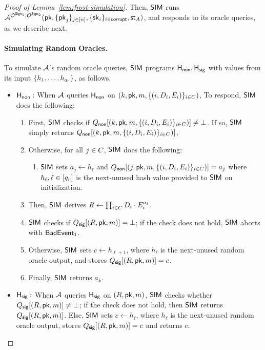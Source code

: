 \begin{proof}[Proof of Lemma~\ref{lem:frost-simulation}]
  Then,
  $\mathsf{SIM}$ runs
  $\mathcal{A}^{ \mathcal{O}^{\mathsf{Sign}_1}, \mathcal{O}^{\mathsf{Sign}_2} }(\mathsf{pk}, \{ \mathsf{pk}_j \}_{j \in [n]}, \{ \mathsf{sk}_i \}_{i \in \mathsf{corrupt}},\mathsf{st}_A)$,
  and responds to its oracle queries,
  as we describe next.

  \medskip
  \paragraph{Simulating Random Oracles.}
  To simulate $\mathcal{A}$'s random oracle queries,
  $\mathsf{SIM}$ programs $\mathsf{H_{non}}, \mathsf{H_{sig}}$ with values from its input
  $\{h_1, \ldots, h_{q_r} \}$,
  as follows.

  \begin{itemize}
  \item{}\underline{$\mathsf{H_{non}}:$} When $\mathcal{A}$ queries $\mathsf{H_{non}}$ on $(k, \mathsf{pk}, m, \{   (i, D_i, E_i)\}_{i \in C})$,
  To respond,
  $\mathsf{SIM}$ does the following:
  \begin{enumerate}
    \item First, $\mathsf{SIM}$ checks if $Q_{\mathsf{non}}[(k, \mathsf{pk}, \allowbreak m,\allowbreak \{ (i, D_i, E_i)\}_{i \in C})] \neq  \bot$.
      If so, $\mathsf{SIM}$ simply returns $Q_{\mathsf{non}}[(k, \mathsf{pk}, \allowbreak m,\allowbreak \{ (i, D_i, E_i)\}_{i \in C})] $,
    \item Otherwise, for all $j \in C$, $\mathsf{SIM}$ does the following:
  \begin{enumerate}
    \item $\mathsf{SIM}$ sets $a_j \gets h_\ell $ and
      $Q_{\mathsf{non}}[(j, \mathsf{pk}, m, \{(i, D_i, E_i)\}_{i \in C})] = a_j$
      where $h_\ell, \ell \in [q_r]$ is the next-unused hash value provided to $\mathsf{SIM}$ on initialization.
  \end{enumerate}
    \item Then, $\mathsf{SIM}$ derives
    $R \gets \prod_{i \in C} D_i \cdot E_i^{a_i}$.
    \item $\mathsf{SIM}$ checks if $Q_{\mathsf{sig}}[(R, \mathsf{pk}, m)] = \bot$;
      if the check does not hold,
      $\mathsf{SIM}$ aborts with $\mathsf{BadEvent}_1$.
    \item Otherwise, $\mathsf{SIM}$ sets $c \gets h_{\ell+1}$,
      where $h_\ell$ is the next-unused random oracle output,
      and stores $Q_{\mathsf{sig}}[(R, \mathsf{pk}, m)] = c$.
    \item Finally, $\mathsf{SIM}$ returns $a_k$.
  \end{enumerate}


  \item{}\underline{$\mathsf{H_{sig}}:$} When $\mathcal{A}$ queries $\mathsf{H_{sig}}$ on $(R, \mathsf{pk}, m)$,
  $\mathsf{SIM}$ checks whether $Q_{\mathsf{sig}}[(R, \mathsf{pk}, m)] \neq \bot$;
  if the check does not hold,
  then
  $\mathsf{SIM}$ returns $Q_{\mathsf{sig}}[(R, \mathsf{pk}, m)]$.
	Else, $\mathsf{SIM}$ sets $c \gets h_\ell$,
  where $h_\ell$ is the next-unused random oracle output,
  stores $Q_{\mathsf{sig}}[(R, \mathsf{pk}, m)] = c$ and returns $c$.
  \end{itemize}



\end{proof}
